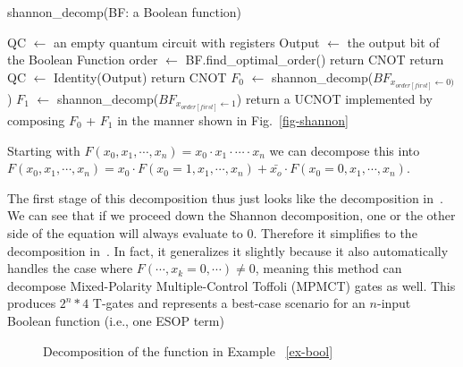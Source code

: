 \begin{algorithm}[tbp]
  \caption{shannon\_decomp(BF: a Boolean function)}
  \label{algo-shannon}
  \begin{algorithmic}
    \State QC $\leftarrow$ an empty quantum circuit with registers
    \State Output $\leftarrow$ the output bit of the Boolean Function
    \State order $\leftarrow$ BF.find\_optimal\_order()
    \State return CNOT
    \State return QC $\leftarrow$ Identity(Output)
    \State return CNOT
    \Else
    \State $F_0$ $\leftarrow$ shannon\_decomp($BF_{x_{order[first]}\leftarrow 0)}$)
    \State $F_1$ $\leftarrow$ shannon\_decomp($BF_{x_{order[first]}\leftarrow 1}$)
    \State return a UCNOT implemented by composing $F_0$ + $F_1$ in the manner shown in Fig.~\ref{fig-shannon}
    \EndIf
  \end{algorithmic}
  
\end{algorithm}

\begin{example}
  \label{ex-rtof}
  Starting with $F(x_0,x_1,\cdots,x_n) = x_0 \cdot x_1 \cdot \cdots \cdot x_n$ we can decompose this into $F(x_0,x_1,\cdots,x_n) = x_0 \cdot F(x_0=1,x_1,\cdots,x_n) + \bar{x_o} \cdot F(x_0=0,x_1,\cdots,x_n)$.

  The first stage of this decomposition thus just looks like the decomposition in~\cite{bib-rtof-maslov}. We can see that if we proceed down the Shannon decomposition, one or the other side of the equation will always evaluate to 0. Therefore it simplifies to the decomposition in~\cite{bib-amy-phase-state}. In fact, it generalizes it slightly because it also automatically handles the case where $F(\cdots , x_k=0 , \cdots) \neq 0$, meaning this method can decompose Mixed-Polarity Multiple-Control Toffoli (MPMCT) gates as well.
  This produces $2^n * 4$ T-gates and represents a best-case scenario for an $n$-input Boolean function (i.e., one ESOP term)
\end{example}

\begin{figure*}[t]
  \begin{minipage}{\linewidth}
      \begin{center}
        
      \end{center}
      \caption{Decomposition of the function in Example ~\ref{ex-bool}}
      \label{fig-func-decomp}
  \end{minipage}
\end{figure*}

